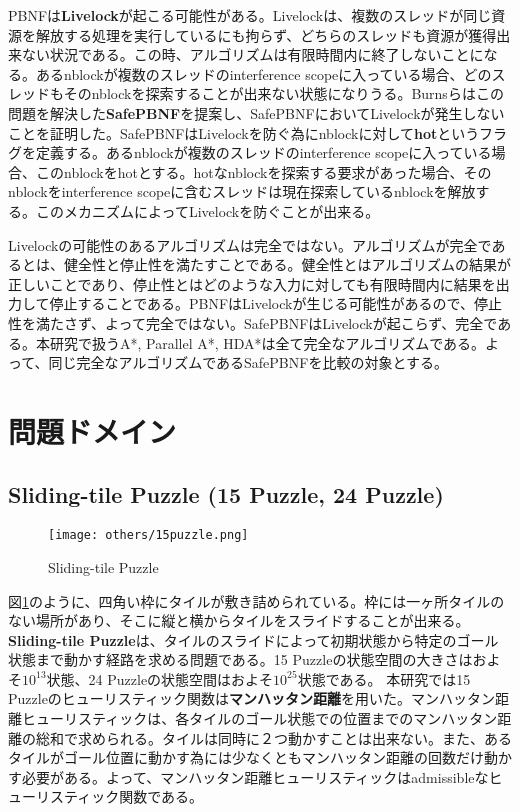 \documentclass[uplatex]{jsarticle}
\begin{document}
PBNFは\textbf{Livelock}が起こる可能性がある。Livelockは、複数のスレッドが同じ資源を解放する処理を実行しているにも拘らず、どちらのスレッドも資源が獲得出来ない状況である。この時、アルゴリズムは有限時間内に終了しないことになる。あるnblockが複数のスレッドのinterference scopeに入っている場合、どのスレッドもそのnblockを探索することが出来ない状態になりうる。Burnsらはこの問題を解決した\textbf{SafePBNF}を提案し、SafePBNFにおいてLivelockが発生しないことを証明した。SafePBNFはLivelockを防ぐ為にnblockに対して\textbf{hot}というフラグを定義する。あるnblockが複数のスレッドのinterference scopeに入っている場合、このnblockをhotとする。hotなnblockを探索する要求があった場合、そのnblockをinterference scopeに含むスレッドは現在探索しているnblockを解放する。このメカニズムによってLivelockを防ぐことが出来る。

Livelockの可能性のあるアルゴリズムは完全ではない。アルゴリズムが完全であるとは、健全性と停止性を満たすことである。健全性とはアルゴリズムの結果が正しいことであり、停止性とはどのような入力に対しても有限時間内に結果を出力して停止することである。PBNFはLivelockが生じる可能性があるので、停止性を満たさず、よって完全ではない。SafePBNFはLivelockが起こらず、完全である。本研究で扱うA*, Parallel A*, HDA*は全て完全なアルゴリズムである。よって、同じ完全なアルゴリズムであるSafePBNFを比較の対象とする。


\newpage

\section{問題ドメイン}
\label{sec:domain}

\subsection{Sliding-tile Puzzle (15 Puzzle, 24 Puzzle)}

\begin{figure}[h]
	\centering
	\texttt{[image: others/15puzzle.png]}
	\caption{Sliding-tile Puzzle}
	\label{fig:15puzzle}
\end{figure}%
図\ref{fig:15puzzle}のように、四角い枠にタイルが敷き詰められている。枠には一ヶ所タイルのない場所があり、そこに縦と横からタイルをスライドすることが出来る。\textbf{Sliding-tile Puzzle}は、タイルのスライドによって初期状態から特定のゴール状態まで動かす経路を求める問題である。15 Puzzleの状態空間の大きさはおよそ$10^{13}$状態、24 Puzzleの状態空間はおよそ$10^{25}$状態である。 本研究では15 Puzzleのヒューリスティック関数は\textbf{マンハッタン距離}を用いた。マンハッタン距離ヒューリスティックは、各タイルのゴール状態での位置までのマンハッタン距離の総和で求められる。タイルは同時に２つ動かすことは出来ない。また、あるタイルがゴール位置に動かす為には少なくともマンハッタン距離の回数だけ動かす必要がある。よって、マンハッタン距離ヒューリスティックはadmissibleなヒューリスティック関数である。
\newline
\end{document}
